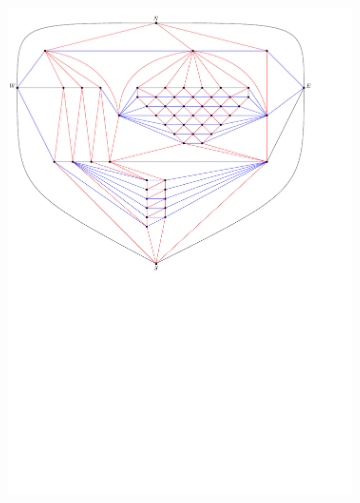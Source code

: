 \begin{figure}
    \ContinuedFloat
    \begin{subfigure}[b]{.9 \textwidth}
      \includegraphics[width=\textwidth]{examples/img/vertWorstCase/sweepfinal}
      \caption{}
      \label{fig:ex:vert:sweepfinal}
    \end{subfigure}
    ~
    \begin{subfigure}[b]{.9 \textwidth}

\end{subfigure}
\end{figure}
